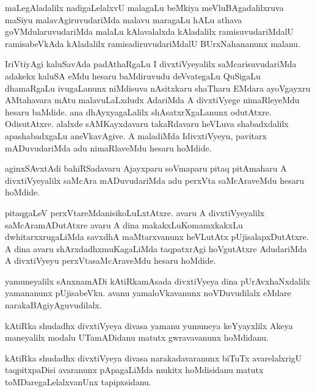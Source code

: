 \documentclass{article}
\begin{document}
\begin{mn}%
maLegAladalilx nadigaLelalxvU malagaLu beMkiya meVluBAgadalilxruva maSiyu malavAgiruvudariMda 
malavu maragaLu hALu athava goVMdularuvudariMda malaLu kAlavalalxda kAladalilx ramisuvudariMdalU 
ramisabeVkAda kAladalilx ramisadiruvudariMdalU BUrxNahananunx malanu.
\end{mn}

\begin{mn}%
IriVtiyAgi kaluSavAda padAthaRgaLu I divxtiVyeyalilx saMcarisuvudariMda adakekx kaluSA eMdu hesaru 
baMdiruvudu deVvategaLu QuSigaLu dhamaRgaLu ivugaLanunx niMdisuva nAsitxkaru shaTharu EMdara 
ayoVgayxru AMtahavara mAtu malavuLaLxdudx AdariMda A divxtiVyege nimaRleyeMdu hesaru baMdide. ana 
dhAyxyagaLalilx shAsatxrXgaLanunx odutAtxre. OdisutAtxre. alalxde sAMKayxdavaru takaRdavaru 
heVLuva shabadxdalilx apashabadxgaLu aneVkavAgive. A maladiMda IdivxtiVyeyu, pavitarx 
mADuvudariMda adu nimaRlaveMdu hesaru hoMdide.
\end{mn}

\begin{mn}%
aginxSAvxtAdi bahiRSadavaru Ajayxparu soVmaparu pitaq pitAmaharu A divxtiVyeyalilx saMcAra 
mADuvudariMda adu perxVta saMcAraveMdu hesaru hoMdide.
\end{mn}

\begin{mn}%
pitaqgaLeV perxVtareMdanisikoLuLxtAtxre. avaru A divxtiVyeyalilx saMcAramADutAtxre avaru A dina 
makakxLuKomamxkakxLu dwhitarxxrugaLiMda savxdhA maMtarxvanunx heVLutAtx pUjisalapxDutAtxre. A dina 
avaru shArxdadhxmuKagaLiMda taqpatxrAgi hoVgutAtxre AdudariMda A divxtiVyeyu perxVtasaMcAraveMdu 
hesaru hoMdide.
\end{mn}

\begin{mn}%
yamuneyalilx sAnxnamADi kAtiRkamAsada divxtiVyeya dina pUrAvxhaNxdalilx yamananunx pUjisabeVku. 
avanu yamaloVkavanunx noVDuvudilalx eMdare narakaBAgiyAguvudilalx.
\end{mn}

\begin{mn}%
kAtiRka shudadhx divxtiVyeya divasa yamanu yumuneya keYyayxlilx Akeya maneyalilx modalu 
UTamADidanu matutx gwravavanunx hoMdidanu.
\end{mn}

\begin{mn}%
kAtiRka shudadhx divxtiVyeya divasa narakadavaranunx biTuTx avarelalxrigU taqpitxpaDisi avaranunx 
pApagaLiMda mukitx hoMdisidanu matutx toMDaregaLelalxvanUnx tapipxsidanu.
\end{mn}
\end{document}
